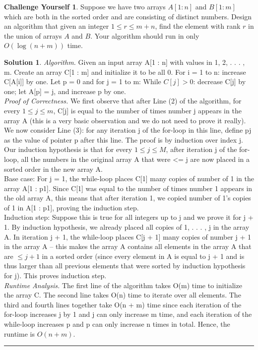 \documentclass{article}
\theoremstyle{definition}
\newtheorem*{challenge}{Challenge Yourself}
\def\fline{\rule{0.75\linewidth}{0.5pt}}
\newcommand{\finishline}{\begin{center}\fline\end{center}}
\newtheorem*{solution*}{Solution}
\newenvironment{solution}{\begin{solution*}}{{\finishline} \end{solution*}}
\begin{document}
\begin{challenge}
	Suppose we have two arrays $A[1:n]$ and $B[1:m]$ which are both in the sorted order and are consisting of distinct numbers. Design an algorithm that given an integer $1 \leq r \leq m+n$, find the element with rank $r$ 
	in the union of arrays $A$ and $B$. Your algorithm should run in only $O(\log{(n+m)})$ time. 
	
	\begin{solution}
		
		\emph{Algorithm.}  Given an input array A[1 : n] with values in {1, 2, . . . , m}. Create an array C[1 : m] and initialize it to be all 0. For i = 1 to n: increase C[A[i]] by one.  Let p = 0 and for j = 1 to m: While $C[j] > 0$: decrease C[j] by one; let A[p] = j, and increase p by one. \\
		
		\emph{Proof of Correctness.} We first observe that after Line (2) of the algorithm, for every $1 \leq j \leq m$, C[j] is equal to the number of times number j appears in the array A (this is a very basic observation and we do
not need to prove it really). We now consider Line (3): for any iteration j of the for-loop in this line, define pj as the value of pointer p after this line. The proof is by induction over index j. Our induction hypothesis is that for every $1 \leq j \leq M$,
after iteration j of the for-loop, all the numbers in the original array A that were <= j are now placed in a sorted order in the new array A. \\
Base case: For j = 1, the while-loop places C[1] many copies of number of 1 in the array A[1 : p1]. Since C[1] was equal to the number of times number 1 appears in the old array A, this means that after iteration 1, we copied number of 1’s copies of 1 in A[1 : p1], proving the induction step. \\
Induction step: Suppose this is true for all integers up to j and we prove it for j + 1. By induction hypothesis, we already placed all copies of {1, . . . , j} in the array A. In iteration j + 1, the while-loop places C[j + 1] many copies of number j + 1 in the array A – this makes the array A contains all elements in the array A that are $\leq j + 1$ in a sorted order (since every element in A is equal to j + 1 and is thus larger than all previous elements that were sorted by induction hypothesis for j). This proves induction step.\\
				
		\emph{Runtime Analysis.} The first line of the algorithm takes O(m) time to initialize the array C. The second line takes O(n) time to iterate over all elements. The third and fourth lines together take O(n + m) time since each iteration of the for-loop increases j by 1 and j can only increase m time, and each iteration of the while-loop increases p and p can only increase n times in total. Hence, the runtime is $O(n + m)$. \\		
	\end{solution}


\end{challenge}
\end{document}

